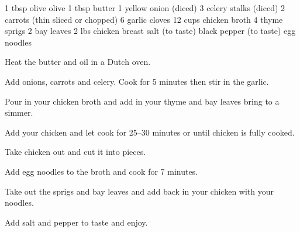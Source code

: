 \dishtype{\soup}
\begin{ingreds}
    1 tbsp olive olive
    1 tbsp butter
    1 yellow onion (diced)
    3 celery stalks (diced)
    2 carrots (thin sliced or chopped)
    6 garlic cloves
    12 cups chicken broth
    4 thyme sprigs
    2 bay leaves
    2 lbs chicken breast
    salt (to taste)
    black pepper (to taste)
    egg noodles
\end{ingreds}
\begin{method}
    Heat the butter and oil in a Dutch oven.\par
    Add onions, carrots and celery. Cook for 5 minutes then stir in the garlic.\par
    Pour in your chicken broth and add in your thyme and bay leaves bring to a simmer.\par
    Add your chicken and let cook for 25--30 minutes or until chicken is fully cooked.\par
    Take chicken out and cut it into pieces.\par
    Add egg noodles to the broth and cook for 7 minutes.\par
    Take out the sprigs and bay leaves and add back in your chicken with your noodles.\par
    Add salt and pepper to taste and enjoy.
\end{method}